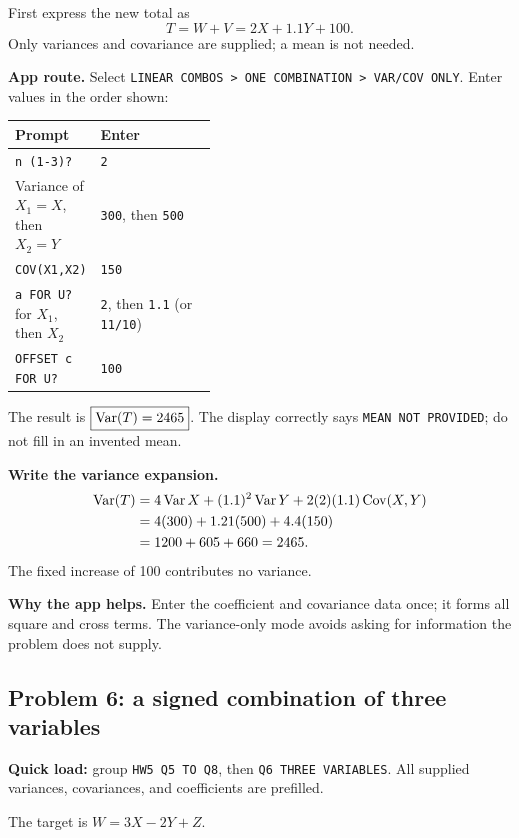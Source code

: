 First express the new total as
\[
T=W+V=2X+1.1Y+100.
\]
Only variances and covariance are supplied; a mean is not needed.

\textbf{App route.} Select \texttt{LINEAR COMBOS > ONE COMBINATION > VAR/COV ONLY}. Enter values in the order shown:
\begin{center}
\begin{tabularx}{\linewidth}{@{}p{0.40\linewidth}X@{}}
\toprule Prompt & Enter\\\midrule
\texttt{n (1-3)?} & \texttt{2}\\
Variance of $X_1=X$, then $X_2=Y$ & \texttt{300}, then \texttt{500}\\
\texttt{COV(X1,X2)} & \texttt{150}\\
\texttt{a FOR U?} for $X_1$, then $X_2$ & \texttt{2}, then \texttt{1.1} (or \texttt{11/10})\\
\texttt{OFFSET c FOR U?} & \texttt{100}\\\bottomrule
\end{tabularx}
\end{center}
The result is $\boxed{\operatorname{Var}(T)=2465}$. The display correctly says \texttt{MEAN NOT PROVIDED}; do not fill in an invented mean.

\textbf{Write the variance expansion.}
\[
\begin{aligned}
\operatorname{Var}(T)&=4\operatorname{Var} X+(1.1)^2\operatorname{Var} Y+2(2)(1.1)\operatorname{Cov}(X,Y)\\
&=4(300)+1.21(500)+4.4(150)\\
&=1200+605+660=2465.
\end{aligned}
\]
The fixed increase of 100 contributes no variance.

\textbf{Why the app helps.} Enter the coefficient and covariance data once; it forms all square and cross terms. The variance-only mode avoids asking for information the problem does not supply.

\subsection{Problem 6: a signed combination of three variables}
\textbf{Quick load:} group \texttt{HW5 Q5 TO Q8}, then \texttt{Q6 THREE VARIABLES}. All supplied variances, covariances, and coefficients are prefilled.

The target is $W=3X-2Y+Z$.

